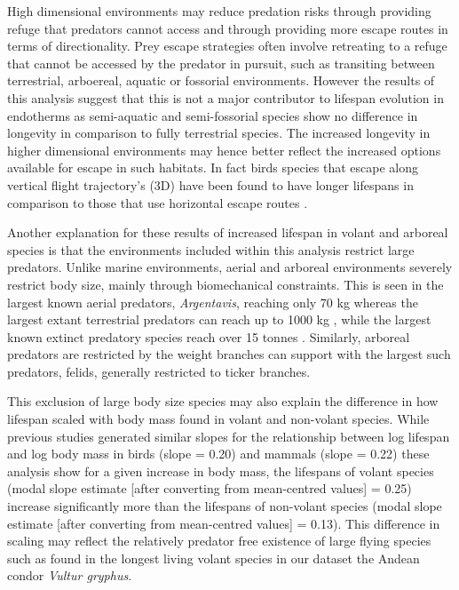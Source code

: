 High dimensional environments may reduce predation risks through providing refuge that predators cannot access and through providing more escape routes in terms of directionality. Prey escape strategies often involve retreating to a refuge that cannot be accessed by the predator in pursuit, such as transiting between terrestrial, arboereal, aquatic or fossorial environments. However the results of this analysis suggest that this is not a major contributor to lifespan evolution in endotherms as semi-aquatic and semi-fossorial species show no difference in longevity in comparison to fully terrestrial species. The increased longevity in higher dimensional environments may hence better reflect the increased options available for escape in such habitats. In fact birds species that escape along vertical flight trajectory's (3D) have been found to have longer lifespans in comparison to those that use horizontal escape routes \citep{moller2010up}. 


Another explanation for these results of increased lifespan in volant and arboreal species is that the environments included within this analysis restrict large predators. Unlike marine environments, aerial and arboreal environments severely restrict body size, mainly through biomechanical constraints. This is seen in the largest known aerial predators, \textit{Argentavis}, reaching only 70 kg \citep{chatterjee2007aerodynamics} whereas the largest extant terrestrial predators can reach up to 1000 kg \citep{carwardine1995guinness}, while the largest known extinct predatory species reach over 15 tonnes \citep{therrien2007my}. Similarly, arboreal predators are restricted by the weight branches can support with the largest such predators, felids, generally restricted to ticker branches. 


This exclusion of large body size species may also explain the difference in how lifespan scaled with body mass found in volant and non-volant species. While previous studies generated similar slopes for the relationship between log lifespan and log body mass in birds (slope = 0.20) and mammals (slope = 0.22) \citep{lindstedt1981body,hulbert2007life} these analysis show for a given increase in body mass, the lifespans of volant species (modal slope estimate [after converting from mean-centred values] = 0.25) increase significantly more than the lifespans of non-volant species (modal slope estimate [after converting from mean-centred values] = 0.13). This difference in scaling may reflect the relatively predator free existence of large flying species such as found in the longest living volant species in our dataset the Andean condor \textit{Vultur gryphus}.


